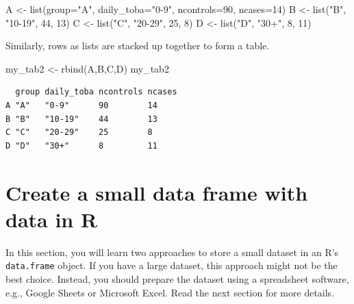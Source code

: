 \documentclass[
  letterpaper,
]{book}
\newenvironment{Shaded}{\begin{snugshade}}{\end{snugshade}}
\newcommand{\AttributeTok}[1]{\textcolor[rgb]{0.40,0.45,0.13}{#1}}
\newcommand{\DecValTok}[1]{\textcolor[rgb]{0.68,0.00,0.00}{#1}}
\newcommand{\FunctionTok}[1]{\textcolor[rgb]{0.28,0.35,0.67}{#1}}
\newcommand{\NormalTok}[1]{\textcolor[rgb]{0.00,0.23,0.31}{#1}}
\newcommand{\OtherTok}[1]{\textcolor[rgb]{0.00,0.23,0.31}{#1}}
\newcommand{\StringTok}[1]{\textcolor[rgb]{0.13,0.47,0.30}{#1}}
\begin{document}
\begin{Shaded}
\begin{Highlighting}[]
\NormalTok{A }\OtherTok{\textless{}{-}} \FunctionTok{list}\NormalTok{(}\AttributeTok{group=}\StringTok{"A"}\NormalTok{, }\AttributeTok{daily\_toba=}\StringTok{"0{-}9"}\NormalTok{, }\AttributeTok{ncontrols=}\DecValTok{90}\NormalTok{, }\AttributeTok{ncases=}\DecValTok{14}\NormalTok{)}
\NormalTok{B }\OtherTok{\textless{}{-}} \FunctionTok{list}\NormalTok{(}\StringTok{"B"}\NormalTok{, }\StringTok{"10{-}19"}\NormalTok{, }\DecValTok{44}\NormalTok{, }\DecValTok{13}\NormalTok{)}
\NormalTok{C }\OtherTok{\textless{}{-}} \FunctionTok{list}\NormalTok{(}\StringTok{"C"}\NormalTok{, }\StringTok{"20{-}29"}\NormalTok{, }\DecValTok{25}\NormalTok{, }\DecValTok{8}\NormalTok{)}
\NormalTok{D }\OtherTok{\textless{}{-}} \FunctionTok{list}\NormalTok{(}\StringTok{"D"}\NormalTok{, }\StringTok{"30+"}\NormalTok{, }\DecValTok{8}\NormalTok{, }\DecValTok{11}\NormalTok{)}
\end{Highlighting}
\end{Shaded}

Similarly, rows as lists are stacked up together to form a table.

\begin{Shaded}
\begin{Highlighting}[]
\NormalTok{my\_tab2 }\OtherTok{\textless{}{-}} \FunctionTok{rbind}\NormalTok{(A,B,C,D)}
\NormalTok{my\_tab2}
\end{Highlighting}
\end{Shaded}

\begin{verbatim}
  group daily_toba ncontrols ncases
A "A"   "0-9"      90        14    
B "B"   "10-19"    44        13    
C "C"   "20-29"    25        8     
D "D"   "30+"      8         11    
\end{verbatim}

\section{Create a small data frame with data in
R}\label{create-a-small-data-frame-with-data-in-r}

In this section, you will learn two approaches to store a small dataset
in an R's \texttt{data.frame} object. If you have a large dataset, this
approach might not be the best choice. Instead, you should prepare the
dataset using a spreadsheet software, e.g., Google Sheets or Microsoft
Excel. Read the next section for more details.
\end{document}

